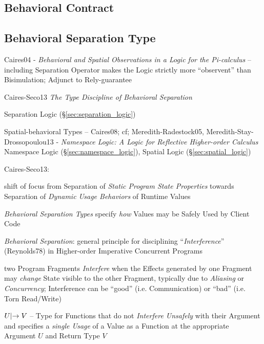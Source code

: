 \subsection{Behavioral Contract}\label{sec:behavioral_contract}

\subsection{Behavioral Separation Type}\label{sec:behavioral_separation}

Caires04 - \emph{Behavioral and Spatial Observations in a Logic for the
  Pi-calculus} -- including Separation Operator makes the Logic strictly more
``observent'' than Bisimulation; Adjunct to Rely-guarantee

Caires-Seco13 \emph{The Type Discipline of Behavioral Separation}

Separation Logic (\S\ref{sec:separation_logic})

Spatial-behavioral Types -- Caires08; cf; Meredith-Radestock05,
Meredith-Stay-Drossopoulou13 - \emph{Namespace Logic: A Logic for Reflective
  Higher-order Calculus} \fist Namespace Logic
(\S\ref{sec:namespace_logic}), Spatial Logic (\S\ref{sec:spatial_logic})

Caires-Seco13:

shift of focus from Separation of \emph{Static Program State
  Properties} towards Separation of \emph{Dynamic Usage Behaviors} of
Runtime Values

\emph{Behavioral Separation Types} specify \emph{how} Values may be
Safely Used by Client Code

\emph{Behavioral Separation}: general principle for disciplining
``\emph{Interference}'' (Reynolds78) in Higher-order Imperative
Concurrent Programs

two Program Fragments \emph{Interfere} when the Effects generated by
one Fragment may \emph{change} State visible to the other Fragment,
typically due to \emph{Aliasing} or \emph{Concurrency}; Interference
can be ``good'' (i.e. Communication) or ``bad'' (i.e. Torn Read/Write)

$U \mathrlap{|}\rightarrow V$ -- Type for Functions that do not \emph{Interfere
  Unsafely} with their Argument and specifies a \emph{single Usage} of
a Value as a Function at the appropriate Argument $U$ and Return Type
$V$



